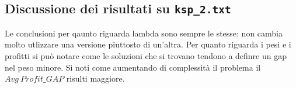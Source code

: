\documentclass[a4paper,12pt]{article}
\begin{document}
\subsection*{Discussione dei risultati su \texttt{ksp\_2.txt}}
Le conclusioni per qaunto riguarda lambda sono sempre le stesse: non cambia molto utlizzare
una versione piuttosto di un'altra.
Per quanto riguarda i pesi e i profitti si può notare come le soluzioni che si trovano 
tendono a definre un gap nel peso minore.
Si noti come aumentando di complessità il problema il \(Avg\ Profit\_ GAP\) risulti maggiore.
\end{document}
